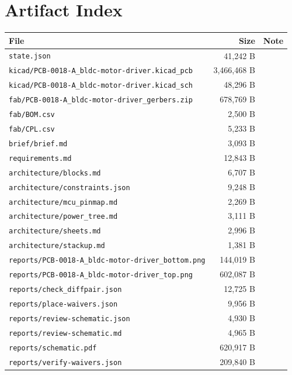 \documentclass[11pt,a4paper]{article}
\begin{document}
\section{Artifact Index}
{\small
\begin{longtable}{p{9cm}rp{4cm}}
\toprule
\textbf{File} & \textbf{Size} & \textbf{Note} \\
\midrule
\endhead
\texttt{state.json} & 41,242 B &  \\
\texttt{kicad/PCB-0018-A\_bldc-motor-driver.kicad\_pcb} & 3,466,468 B &  \\
\texttt{kicad/PCB-0018-A\_bldc-motor-driver.kicad\_sch} & 48,296 B &  \\
\texttt{fab/PCB-0018-A\_bldc-motor-driver\_gerbers.zip} & 678,769 B &  \\
\texttt{fab/BOM.csv} & 2,500 B &  \\
\texttt{fab/CPL.csv} & 5,233 B &  \\
\texttt{brief/brief.md} & 3,093 B &  \\
\texttt{requirements.md} & 12,843 B &  \\
\texttt{architecture/blocks.md} & 6,707 B &  \\
\texttt{architecture/constraints.json} & 9,248 B &  \\
\texttt{architecture/mcu\_pinmap.md} & 2,269 B &  \\
\texttt{architecture/power\_tree.md} & 3,111 B &  \\
\texttt{architecture/sheets.md} & 2,996 B &  \\
\texttt{architecture/stackup.md} & 1,381 B &  \\
\texttt{reports/PCB-0018-A\_bldc-motor-driver\_bottom.png} & 144,019 B &  \\
\texttt{reports/PCB-0018-A\_bldc-motor-driver\_top.png} & 602,087 B &  \\
\texttt{reports/check\_diffpair.json} & 12,725 B &  \\
\texttt{reports/place-waivers.json} & 9,956 B &  \\
\texttt{reports/review-schematic.json} & 4,930 B &  \\
\texttt{reports/review-schematic.md} & 4,965 B &  \\
\texttt{reports/schematic.pdf} & 620,917 B &  \\
\texttt{reports/verify-waivers.json} & 209,840 B &  \\
\bottomrule
\end{longtable}
}
\end{document}
